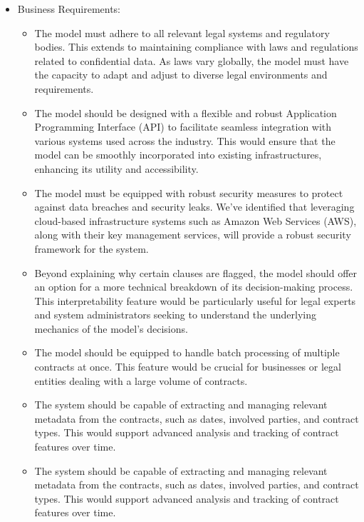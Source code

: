 \begin{itemize}
\begin{itemize}
    \end{itemize}
    \item Business Requirements: 
    \begin{itemize}
        \item The model must adhere to all relevant legal systems and regulatory bodies. This extends to maintaining compliance with laws and regulations related to confidential data. As laws vary globally, the model must have the capacity to adapt and adjust to diverse legal environments and requirements.
        \item The model should be designed with a flexible and robust Application Programming Interface (API) to facilitate seamless integration with various systems used across the industry. This would ensure that the model can be smoothly incorporated into existing infrastructures, enhancing its utility and accessibility.
        \item The model must be equipped with robust security measures to protect against data breaches and security leaks. We've identified that leveraging cloud-based infrastructure systems such as Amazon Web Services (AWS)\cite{aws}, along with their key management services, will provide a robust security framework for the system.
        \item Beyond explaining why certain clauses are flagged, the model should offer an option for a more technical breakdown of its decision-making process. This interpretability feature would be particularly useful for legal experts and system administrators seeking to understand the underlying mechanics of the model's decisions.
        \item The model should be equipped to handle batch processing of multiple contracts at once. This feature would be crucial for businesses or legal entities dealing with a large volume of contracts.
        \item The system should be capable of extracting and managing relevant metadata from the contracts, such as dates, involved parties, and contract types. This would support advanced analysis and tracking of contract features over time.
        \item The system should be capable of extracting and managing relevant metadata from the contracts, such as dates, involved parties, and contract types. This would support advanced analysis and tracking of contract features over time.















\end{itemize}
\end{itemize}
